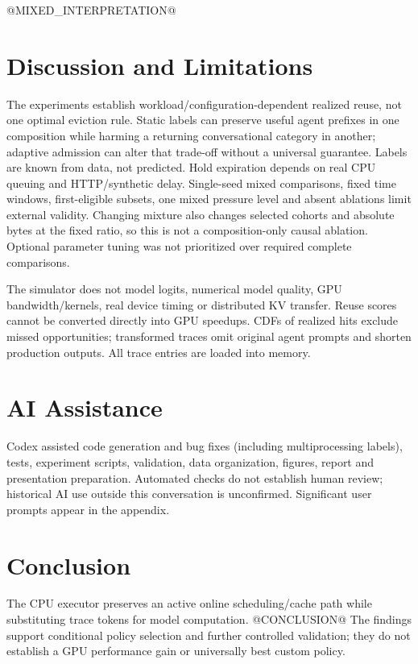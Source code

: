 \documentclass{article}
\begin{document}
@MIXED_INTERPRETATION@

\section{Discussion and Limitations}
The experiments establish workload/configuration-dependent realized reuse, not one optimal eviction rule. Static labels can preserve useful agent prefixes in one composition while harming a returning conversational category in another; adaptive admission can alter that trade-off without a universal guarantee. Labels are known from data, not predicted. Hold expiration depends on real CPU queuing and HTTP/synthetic delay. Single-seed mixed comparisons, fixed time windows, first-eligible subsets, one mixed pressure level and absent ablations limit external validity. Changing mixture also changes selected cohorts and absolute bytes at the fixed ratio, so this is not a composition-only causal ablation. Optional parameter tuning was not prioritized over required complete comparisons.

The simulator does not model logits, numerical model quality, GPU bandwidth/kernels, real device timing or distributed KV transfer. Reuse scores cannot be converted directly into GPU speedups. CDFs of realized hits exclude missed opportunities; transformed traces omit original agent prompts and shorten production outputs. All trace entries are loaded into memory.

\section{AI Assistance}
Codex assisted code generation and bug fixes (including multiprocessing labels), tests, experiment scripts, validation, data organization, figures, report and presentation preparation. Automated checks do not establish human review; historical AI use outside this conversation is unconfirmed. Significant user prompts appear in the appendix.

\section{Conclusion}
The CPU executor preserves an active online scheduling/cache path while substituting trace tokens for model computation. @CONCLUSION@ The findings support conditional policy selection and further controlled validation; they do not establish a GPU performance gain or universally best custom policy.

\clearpage


\clearpage
\appendix
\end{document}
